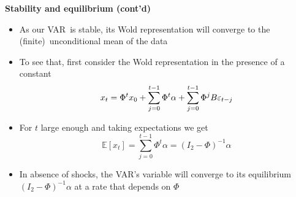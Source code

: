 \documentclass[10pt,english,t,aspectratio=169,ignorenonframetext]{beamer}
\begin{document}
\begin{frame}
{\textbf{Stability and equilibrium (cont'd)}}

\begin{itemize}
\item As our VAR\ is stable, its Wold representation will converge to the
(finite)\ unconditional mean of the data\bigskip

\item To see that, first consider the Wold representation in the presence of
a constant%
\begin{equation*}
x_{t}={\Phi ^{t}x_{0}+\sum\limits_{j=0}^{t-1}\Phi ^{t}\alpha }+{%
\sum\limits_{j=0}^{t-1}\Phi ^{j}B{\varepsilon _{t-j}}}
\end{equation*}
\vspace{-.1cm}

\item For $t$ large enough and taking expectations we get 
\begin{equation*}
\mathbb{E}\left[ x_{t}\right] ={\sum\limits_{j=0}^{t-1}\Phi ^{t}\alpha =}%
\left( I_{2}-\Phi \right) ^{-1}\alpha
\end{equation*}
\vspace{-.1cm}

\item In absence of shocks, the VAR's variable will converge to its
equilibrium $\left( I_{2}-\Phi \right) ^{-1}\alpha $ at a rate that depends
on $\Phi $
\end{itemize}
\end{frame}

\end{document}
